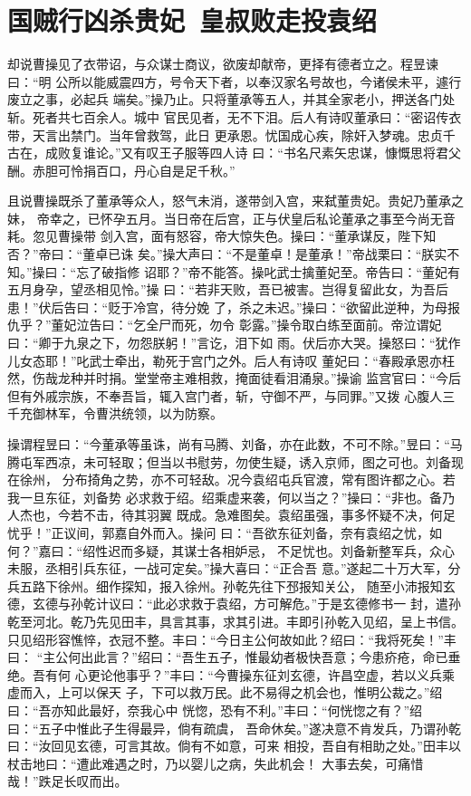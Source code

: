\chapter{国贼行凶杀贵妃~皇叔败走投袁绍}

却说曹操见了衣带诏，与众谋士商议，欲废却献帝，更择有德者立之。程昱谏曰：“明
公所以能威震四方，号令天下者，以奉汉家名号故也，今诸侯未平，遽行废立之事，必起兵
端矣。”操乃止。只将董承等五人，并其全家老小，押送各门处斩。死者共七百余人。城中
官民见者，无不下泪。后人有诗叹董承曰：“密诏传衣带，天言出禁门。当年曾救驾，此日
更承恩。忧国成心疾，除奸入梦魂。忠贞千古在，成败复谁论。”又有叹王子服等四人诗
曰：“书名尺素矢忠谋，慷慨思将君父酬。赤胆可怜捐百口，丹心自是足千秋。”

且说曹操既杀了董承等众人，怒气未消，遂带剑入宫，来弑董贵妃。贵妃乃董承之妹，
帝幸之，已怀孕五月。当日帝在后宫，正与伏皇后私论董承之事至今尚无音耗。忽见曹操带
剑入宫，面有怒容，帝大惊失色。操曰：“董承谋反，陛下知否？”帝曰：“董卓已诛
矣。”操大声曰：“不是董卓！是董承！”帝战栗曰：“朕实不知。”操曰：“忘了破指修
诏耶？”帝不能答。操叱武士擒董妃至。帝告曰：“董妃有五月身孕，望丞相见怜。”操
曰：“若非天败，吾已被害。岂得复留此女，为吾后患！”伏后告曰：“贬于冷宫，待分娩
了，杀之未迟。”操曰：“欲留此逆种，为母报仇乎？”董妃泣告曰：“乞全尸而死，勿令
彰露。”操令取白练至面前。帝泣谓妃曰：“卿于九泉之下，勿怨朕躬！”言讫，泪下如
雨。伏后亦大哭。操怒曰：“犹作儿女态耶！”叱武士牵出，勒死于宫门之外。后人有诗叹
董妃曰：“春殿承恩亦枉然，伤哉龙种并时捐。堂堂帝主难相救，掩面徒看泪涌泉。”操谕
监宫官曰：“今后但有外戚宗族，不奉吾旨，辄入宫门者，斩，守御不严，与同罪。”又拨
心腹人三千充御林军，令曹洪统领，以为防察。

操谓程昱曰：“今董承等虽诛，尚有马腾、刘备，亦在此数，不可不除。”昱曰：“马
腾屯军西凉，未可轻取；但当以书慰劳，勿使生疑，诱入京师，图之可也。刘备现在徐州，
分布掎角之势，亦不可轻敌。况今袁绍屯兵官渡，常有图许都之心。若我一旦东征，刘备势
必求救于绍。绍乘虚来袭，何以当之？”操曰：“非也。备乃人杰也，今若不击，待其羽翼
既成。急难图矣。袁绍虽强，事多怀疑不决，何足忧乎！”正议间，郭嘉自外而入。操问
曰：“吾欲东征刘备，奈有袁绍之忧，如何？”嘉曰：“绍性迟而多疑，其谋士各相妒忌，
不足忧也。刘备新整军兵，众心未服，丞相引兵东征，一战可定矣。”操大喜曰：“正合吾
意。”遂起二十万大军，分兵五路下徐州。细作探知，报入徐州。孙乾先往下邳报知关公，
随至小沛报知玄德，玄德与孙乾计议曰：“此必求救于袁绍，方可解危。”于是玄德修书一
封，遣孙乾至河北。乾乃先见田丰，具言其事，求其引进。丰即引孙乾入见绍，呈上书信。
只见绍形容憔悴，衣冠不整。丰曰：“今日主公何故如此？绍曰：“我将死矣！”丰曰：
“主公何出此言？”绍曰：“吾生五子，惟最幼者极快吾意；今患疥疮，命已垂绝。吾有何
心更论他事乎？”丰曰：“今曹操东征刘玄德，许昌空虚，若以义兵乘虚而入，上可以保天
子，下可以救万民。此不易得之机会也，惟明公裁之。”绍曰：“吾亦知此最好，奈我心中
恍惚，恐有不利。”丰曰：“何恍惚之有？”绍曰：“五子中惟此子生得最异，倘有疏虞，
吾命休矣。”遂决意不肯发兵，乃谓孙乾曰：“汝回见玄德，可言其故。倘有不如意，可来
相投，吾自有相助之处。”田丰以杖击地曰：“遭此难遇之时，乃以婴儿之病，失此机会！
大事去矣，可痛惜哉！”跌足长叹而出。

